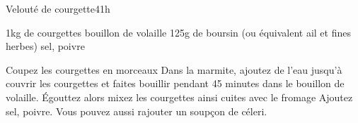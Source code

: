 \begin{recette}{Velouté de courgette}{4}{1h}{}
\begin{ingredients}
\ingredient 1kg de courgettes
\ingredient bouillon de volaille
\ingredient 125g de boursin (ou équivalent ail et fines herbes)
\ingredient sel, poivre
\end{ingredients}

\begin{preparation}
\etape Coupez les courgettes en morceaux 
\etape Dans la marmite, ajoutez de l'eau jusqu'à couvrir les courgettes et faites bouillir pendant 45 minutes dans le bouillon
de volaille. 
\etape Égouttez alors mixez les courgettes ainsi cuites avec le fromage
\etape Ajoutez sel, poivre. Vous pouvez aussi rajouter un soupçon de céleri.
\end{preparation}
\end{recette}

